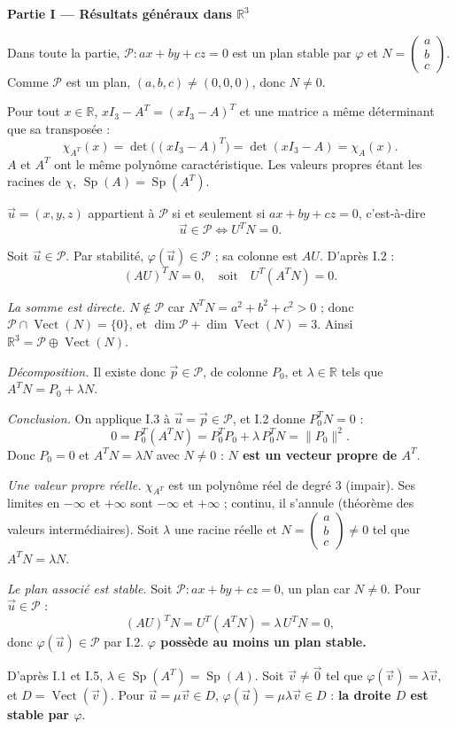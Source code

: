 \documentclass[a4paper,11pt]{article}
\numberwithin{equation}{section}
\numberwithin{figure}{section}
\numberwithin{table}{section}
\theoremstyle{enonce}
\theoremstyle{exemple}
\theoremstyle{remarque}
\newcommand{\R}{\mathbb{R}}
\newcommand{\vect}{\operatorname{Vect}}
\providecommand{\Sp}{\operatorname{Sp}}\providecommand{\Ker}{\operatorname{Ker}}\renewcommand{\Im}{\operatorname{Im}}
\newcommand{\Partie}[1]{\par\needspace{5\baselineskip}\vspace{1.1em}\noindent
  {\sffamily\bfseries\large\color{Bleu}#1}\par\vspace{2pt}{\color{Filet}\rule{\linewidth}{0.4pt}}\par\smallskip}
\newcommand{\Q}[1]{\par\needspace{3\baselineskip}\medskip\noindent{\sffamily\bfseries\color{Bleu}#1}\enspace}
\newcommand{\col}[3]{\begin{pmatrix}#1\\#2\\#3\end{pmatrix}}
\newcommand{\vu}{\vec u}
\begin{document}
\Partie{Partie I — Résultats généraux dans $\R^3$}

Dans toute la partie, $\mathcal P : ax+by+cz=0$ est un plan stable par $\varphi$ et $N=\col abc$. Comme $\mathcal P$ est un plan,
$(a,b,c)\neq(0,0,0)$, donc $N\neq0$.

\Q{I.1} Pour tout $x\in\R$, $xI_3-A^T=(xI_3-A)^T$ et une matrice a même déterminant que sa transposée :
\[\chi_{A^T}(x)=\det\big((xI_3-A)^T\big)=\det(xI_3-A)=\chi_A(x).\]
$A$ et $A^T$ ont le même polynôme caractéristique. Les valeurs propres étant les racines de $\chi$, \textbf{$\Sp(A)=\Sp(A^T)$}.

\Q{I.2} $\vu=(x,y,z)$ appartient à $\mathcal P$ si et seulement si $ax+by+cz=0$, c'est-à-dire
\[\vu\in\mathcal P\iff U^TN=0 .\]

\Q{I.3} Soit $\vu\in\mathcal P$. Par stabilité, $\varphi(\vu)\in\mathcal P$ ; sa colonne est $AU$. D'après I.2 :
\[(AU)^TN=0,\quad\text{soit}\quad U^T(A^TN)=0 .\]

\Q{I.4} \emph{La somme est directe.} $N\notin\mathcal P$ car $N^TN=a^2+b^2+c^2>0$ ; donc $\mathcal P\cap\vect(N)=\{0\}$, et
$\dim\mathcal P+\dim\vect(N)=3$. Ainsi $\R^3=\mathcal P\oplus\vect(N)$.

\emph{Décomposition.} Il existe donc $\vec p\in\mathcal P$, de colonne $P_0$, et $\lambda\in\R$ tels que $A^TN=P_0+\lambda N$.

\emph{Conclusion.} On applique I.3 à $\vu=\vec p\in\mathcal P$, et I.2 donne $P_0^TN=0$ :
\[0=P_0^T(A^TN)=P_0^TP_0+\lambda\,P_0^TN=\|P_0\|^2 .\]
Donc $P_0=0$ et $A^TN=\lambda N$ avec $N\neq0$ : \textbf{$N$ est un vecteur propre de $A^T$}.

\Q{I.5} \emph{Une valeur propre réelle.} $\chi_{A^T}$ est un polynôme réel de degré $3$ (impair). Ses limites en $-\infty$ et
$+\infty$ sont $-\infty$ et $+\infty$ ; continu, il s'annule (théorème des valeurs intermédiaires). Soit $\lambda$ une racine réelle et
$N=\col abc\neq0$ tel que $A^TN=\lambda N$.

\emph{Le plan associé est stable.} Soit $\mathcal P : ax+by+cz=0$, un plan car $N\neq0$. Pour $\vu\in\mathcal P$ :
\[(AU)^TN=U^T(A^TN)=\lambda\,U^TN=0,\]
donc $\varphi(\vu)\in\mathcal P$ par I.2. \textbf{$\varphi$ possède au moins un plan stable.}

\Q{I.6} D'après I.1 et I.5, $\lambda\in\Sp(A^T)=\Sp(A)$. Soit $\vec v\neq\vec 0$ tel que $\varphi(\vec v)=\lambda\vec v$, et
$D=\vect(\vec v)$. Pour $\vu=\mu\vec v\in D$, $\varphi(\vu)=\mu\lambda\vec v\in D$ : \textbf{la droite $D$ est stable par $\varphi$}.
\end{document}
